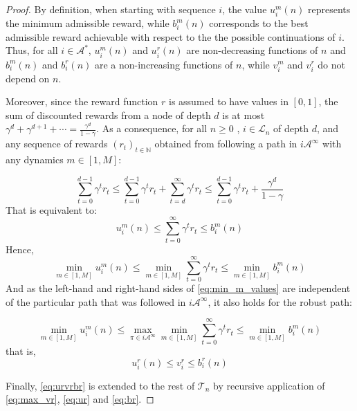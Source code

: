 \documentclass{article}
\begin{document}
\begin{proof}
	By definition, when starting with sequence $i$, the value $u_i^m(n)$ represents the minimum admissible reward, while $b_i^m(n)$ corresponds to the best admissible reward achievable with respect to the the possible continuations of $i$. Thus, for all $i\in\mathcal{A}^*$, $u_i^m(n)$ and $u_i^r(n)$ are non-decreasing functions of $n$ and $b_i^m(n)$ and $b_i^r(n)$ are a non-increasing functions of $n$, while $v_i^m$ and $v_i^r$ do not depend on $n$.
	
	Moreover, since the reward function $r$ is assumed to have values in $[0, 1]$, the sum of discounted rewards from a node of depth $d$ is at most $\gamma^d + \gamma^{d+1}+\cdots = \frac{\gamma^d}{1-\gamma}$. As a consequence, for all $n \geq 0$ , $i\in\mathcal{L}_n$ of depth $d$, and any sequence of rewards $(r_t)_{t\in\mathbb{N}}$ obtained from following a path in $i\mathcal{A}^\infty$ with any dynamics $m \in [1, M]$:
	
	\begin{equation*}
	\sum_{t=0}^{d-1} \gamma^t r_t \leq \sum_{t=0}^{d-1} \gamma^t r_t + \sum_{t=d}^\infty \gamma^t r_t \leq \sum_{t=0}^{d-1} \gamma^t r_t + \frac{\gamma^d}{1-\gamma}
	\end{equation*}
	That is equivalent to:
	\begin{equation*}
	u^m_i(n) \leq \sum_{t=0}^\infty \gamma^t r_t \leq b^m_i(n) 
	\end{equation*}
	Hence,
	\begin{equation}
	\label{eq:min_m_values}
	\min_{m \in [1, M]} u^m_i(n) \leq \min_{m \in [1, M]} \sum_{t=0}^\infty \gamma^t r_t \leq \min_{m \in [1, M]} b^m_i(n)
	\end{equation}
	And as the left-hand and right-hand sides of \eqref{eq:min_m_values} are independent of the particular path that was followed in $i\mathcal{A}^\infty$, it also holds for the robust path:
	
	\begin{equation*}
	\min_{m \in [1, M]} u^m_i(n) \leq \max_{\pi\in i\mathcal{A}^\infty} \min_{m \in [1, M]} \sum_{t=0}^\infty \gamma^t r_t \leq \min_{m \in [1, M]} b^m_i(n)
	\end{equation*}
	that is,
	\begin{equation}
	\label{eq:urvrbr}
	u^r_i(n) \leq v^r_i  \leq b^r_i(n)
	\end{equation}
	
	Finally, \eqref{eq:urvrbr} is extended to the rest of $\mathcal{T}_n$ by recursive application of \eqref{eq:max_vr}, \eqref{eq:ur} and \eqref{eq:br}.
\end{proof}
\end{document}

